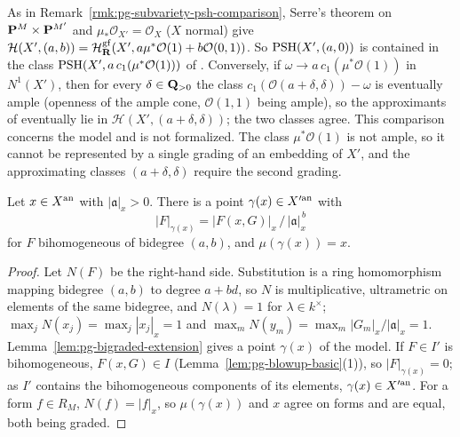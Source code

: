 \begin{remark}\label{rmk:pg-blowup-psh-comparison}
As in Remark~\ref{rmk:pg-subvariety-psh-comparison}, Serre's theorem on $\mathbf{P}^M\times\mathbf{P}^{M'}$ and $\mu_*\mathcal O_{X'}=\mathcal O_X$ ($X$ normal) give
$\mathcal H(X',(a,b))=\mathcal H^{\mathrm{gf}}_{\mathbf{R}}(X',a\mu^*\mathcal O(1)+b\mathcal O(0,1))$. So $\operatorname{PSH}(X',(a,0))$ is contained in the class
$\operatorname{PSH}(X',a\,c_1(\mu^*\mathcal O(1)))$ of \cite[Definition~4.1]{BJ22}. Conversely, if $\omega\to a\,c_1(\mu^*\mathcal O(1))$ in $N^1(X')$, then for
every $\delta\in\mathbf{Q}_{>0}$ the class $c_1(\mathcal O(a+\delta,\delta))-\omega$ is eventually ample (openness of the ample cone, $\mathcal O(1,1)$ being
ample), so the approximants of \cite{BJ22} eventually lie in $\mathcal H(X',(a+\delta,\delta))$; the two classes agree. This comparison concerns
the model and is not formalized. The class $\mu^*\mathcal O(1)$ is not ample, so it cannot be represented by a single grading of an
embedding of $X'$, and the approximating classes $(a+\delta,\delta)$ require the second grading.
\end{remark}

\begin{lemma}\label{lem:pg-graph-point}
\leanok
{}
Let $x\in X^{\mathrm{an}}$ with $|\mathfrak a|_x>0$. There is a point $\gamma(x)\in X'^{\mathrm{an}}$ with
\[
|F|_{\gamma(x)}=|F(x,G)|_x\,/\,|\mathfrak a|_x^{\,b}
\]
for $F$ bihomogeneous of bidegree $(a,b)$, and $\mu(\gamma(x))=x$.
\end{lemma}

\begin{proof}
Let $N(F)$ be the right-hand side. Substitution is a ring homomorphism mapping bidegree $(a,b)$ to degree $a+bd$, so $N$ is
multiplicative, ultrametric on elements of the same bidegree, and $N(\lambda)=1$ for $\lambda\in k^\times$; $\max_jN(x_j)=\max_j|x_j|_x=1$ and
$\max_mN(y_m)=\max_m|G_m|_x/|\mathfrak a|_x=1$. Lemma~\ref{lem:pg-bigraded-extension} gives a point $\gamma(x)$ of the model. If $F\in I'$ is
bihomogeneous, $F(x,G)\in I$ (Lemma~\ref{lem:pg-blowup-basic}(1)), so $|F|_{\gamma(x)}=0$; as $I'$ contains the bihomogeneous components of
its elements, $\gamma(x)\in X'^{\mathrm{an}}$. For a form $f\in R_M$, $N(f)=|f|_x$, so $\mu(\gamma(x))$ and $x$ agree on forms and are equal, both being
graded.
\end{proof}

